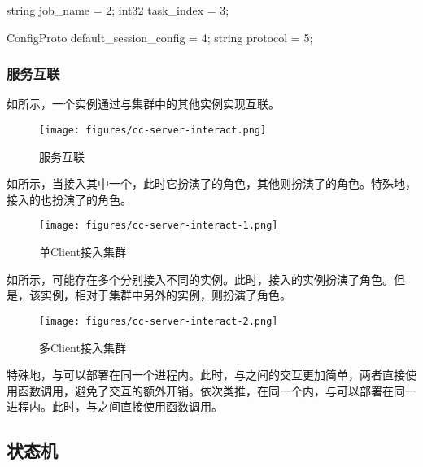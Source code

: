 \begin{content}
\begin{leftbar}
\begin{python}
{  string job_name = 2;
  int32 task_index = 3;

  ConfigProto default_session_config = 4;
  string protocol = 5;
}
\end{python}
\end{leftbar}

\subsubsection{服务互联}

如所示，一个实例通过与集群中的其他实例实现互联。

\begin{figure}[H]
\centering
\texttt{[image: figures/cc-server-interact.png]}
\caption{服务互联}
 \label{fig:cc-server-interact}
\end{figure}

如所示，当接入其中一个，此时它扮演了的角色，其他则扮演了的角色。特殊地，接入的也扮演了的角色。

\begin{figure}[H]
\centering
\texttt{[image: figures/cc-server-interact-1.png]}
\caption{单Client接入集群}
 \label{fig:cc-server-interact-1}
\end{figure}

如所示，可能存在多个分别接入不同的实例。此时，接入的实例扮演了角色。但是，该实例，相对于集群中另外的实例，则扮演了角色。

\begin{figure}[H]
\centering
\texttt{[image: figures/cc-server-interact-2.png]}
\caption{多Client接入集群}
 \label{fig:cc-server-interact-2}
\end{figure}

特殊地，与可以部署在同一个进程内。此时，与之间的交互更加简单，两者直接使用函数调用，避免了交互的额外开销。依次类推，在同一个内，与可以部署在同一进程内。此时，与之间直接使用函数调用。

\subsection{状态机}


\end{content}
